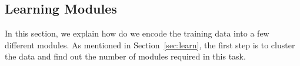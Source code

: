 






\subsection{Learning Modules}
\label{learning}

In this section, we explain how do we encode the training data into a few different modules. As mentioned in Section~\ref{sec:learn}, the first step is to cluster the data and find out the number of modules required in this task.

